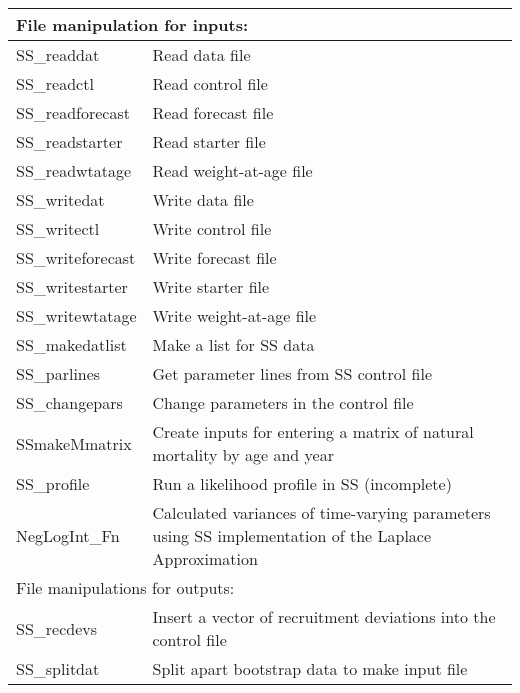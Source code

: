 \begin{center}
\begin{longtable}{p{4.5cm} p{10.52cm}}
		\multicolumn{2}{l}{File manipulation for inputs:}\Tstrut\Bstrut\\
		\hline
		SS\_readdat  \Tstrut & Read data file \\
		SS\_readctl \Tstrut & Read  control file \\
		SS\_readforecast \Tstrut & Read forecast file \\
		SS\_readstarter  \Tstrut & Read starter file \\
		SS\_readwtatage \Tstrut & Read weight-at-age file \\
		SS\_writedat  \Tstrut & Write data file \\
		SS\_writectl \Tstrut & Write control file \\
		SS\_writeforecast \Tstrut & Write forecast file \\
		SS\_writestarter  \Tstrut & Write starter file \\
		SS\_writewtatage \Tstrut & Write weight-at-age file \\
		SS\_makedatlist   \Tstrut & Make a list for SS data \\
		SS\_parlines    \Tstrut & Get parameter lines from SS control file \\
		SS\_changepars  \Tstrut  & Change parameters in the control file \\
		SSmakeMmatrix    \Tstrut & Create inputs for entering a matrix of natural mortality by age and year \\
		SS\_profile      \Tstrut & Run a likelihood profile in SS (incomplete) \\
		NegLogInt\_Fn     \Tstrut& Calculated variances of time-varying parameters using SS implementation of the Laplace Approximation \Bstrut\\
		\hline
		
		\multicolumn{2}{l}{File manipulations for outputs:}\Tstrut\Bstrut\\
		\hline
		SS\_recdevs  \Tstrut & Insert a vector of recruitment deviations into the control file \\
		SS\_splitdat \Tstrut & Split apart bootstrap data to make input file \Bstrut\\
		\hline
		
				

\end{longtable}
\end{center}
